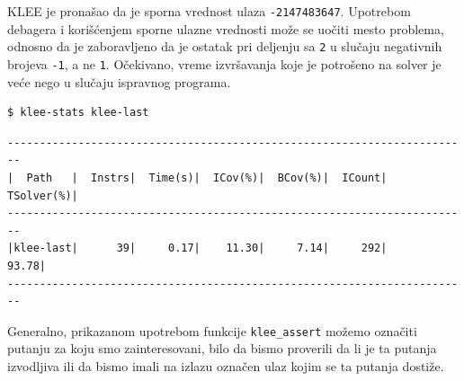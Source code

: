 KLEE je pronašao da je sporna vrednost ulaza \texttt{-2147483647}. Upotrebom debagera i korišćenjem sporne ulazne vrednosti može se uočiti mesto problema, odnosno da je zaboravljeno da je ostatak pri deljenju sa \texttt{2} u slučaju negativnih brojeva \texttt{-1}, a ne \texttt{1}. Očekivano, vreme izvršavanja koje je potrošeno na solver je veće nego u slučaju ispravnog programa.

\begin{verbatim}
$ klee-stats klee-last
\end{verbatim}

\begin{verbatim}
------------------------------------------------------------------------
|  Path   |  Instrs|  Time(s)|  ICov(%)|  BCov(%)|  ICount|  TSolver(%)|
------------------------------------------------------------------------
|klee-last|      39|     0.17|    11.30|     7.14|     292|       93.78|
------------------------------------------------------------------------
\end{verbatim}

Generalno, prikazanom upotrebom funkcije \texttt{klee\_assert} možemo označiti putanju za koju smo zainteresovani, bilo da bismo proverili da li je ta putanja izvodljiva ili da bismo imali na izlazu označen ulaz kojim se ta putanja dostiže.
